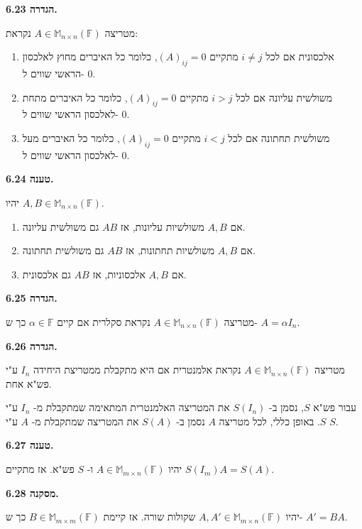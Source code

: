 \documentclass[12pt]{report}
\theoremstyle{plain}
\theoremstyle{definition}
\newcommand{\F}{\mathbb{F}}
\newcommand{\M}{\mathbb{M}}
\newcommand{\0}{\mathbf{0}}
\begin{document}
\noindent\textbf{הגדרה 6.23.}

מטריצה 
$A\in\M_{n\times n}(\F)$
נקראת:

\begin{enumerate}[label=\alph*.]
\item 
אלכסונית אם לכל
$i\neq j$
מתקיים
$(A)_{ij}=0$,
כלומר כל האיברים מחוץ לאלכסון הראשי שווים ל-
$0$.


\item
משולשית עליונה אם לכל
$i>j$
מתקיים
$(A)_{ij}=0$,
כלומר כל האיברים מתחת לאלכסון הראשי שווים ל-
$0$.


\item
משולשית תחתונה אם לכל
$i<j$
מתקיים
$(A)_{ij}=0$,
כלומר כל האיברים מעל לאלכסון הראשי שווים ל-
$0$.


\end{enumerate}
\bigskip
\bigskip

\noindent\textbf{טענה 6.24.}

יהיו
$A,B\in\M_{n\times n}(\F)$.
\begin{enumerate}[label=\alph*.]
\item
אם
$A,B$
משולשיות עליונות, אז
$AB$
גם משולשית עליונה.


\item
אם
$A,B$
משולשיות תחתונות, אז
$AB$
גם משולשית תחתונה.


\item
אם
$A,B$
אלכסוניות, אז
$AB$
גם אלכסונית.


\end{enumerate}
\bigskip
\bigskip

\noindent\textbf{הגדרה 6.25.}

מטריצה 
$A\in\M_{n\times n}(\F)$
נקראת סקלרית אם קיים
$\alpha\in\F$
כך ש-
$A=\alpha I_n$.
\bigskip
\bigskip

\noindent\textbf{הגדרה 6.26.}

מטריצה
$A\in\M_{n\times n}(\F)$
נקראת אלמנטרית אם היא מתקבלת ממטריצת היחידה
$I_n$
ע"י פש"א אחת.

עבור פש"א 
$S$,
נסמן ב-
$S(I_n)$
את המטריצה האלמנטרית המתאימה שמתקבלת מ-
$I_n$
ע"י 
$S$.
באופן כללי, לכל מטריצה
$A$
נסמן ב-
$S(A)$
את המטריצה שמתקבלת מ-
$A$
ע"י
$S$.
\bigskip
\bigskip

\noindent\textbf{טענה 6.27.}

יהיו
$A\in\M_{m\times n}(\F)$
ו-
$S$
פש"א. אז מתקיים
$S(I_m)A=S(A)$.
\bigskip
\bigskip

\noindent\textbf{מסקנה 6.28.}

יהיו
$A,A'\in\M_{m\times n}(\F)$
שקולות שורה. אז קיימת 
$B\in\M_{m\times m}(\F)$
כך ש-
$A'=BA$.
\bigskip
\bigskip
\end{document}
